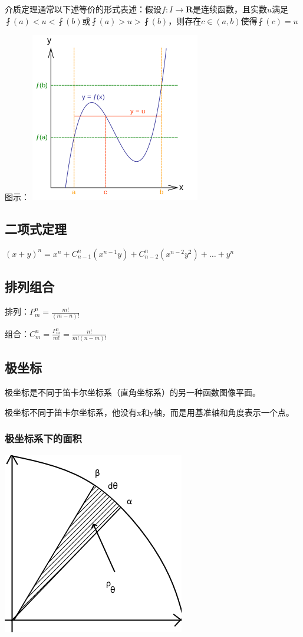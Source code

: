 \documentclass[UTF8]{ctexbook}
\newcommand{\mathCombination}[2]{C_{#1}^{#2}}
\newcommand{\mathPermutation}[2]{P_{#1}^{#2}}
\begin{document}
{{{介质定理通常以下述等价的形式表述：假设$f:I\rightarrow\mathbf{R}$是连续函数，且实数$u$满足$\fint(a)<u<\fint(b)$或$\fint(a)>u>\fint(b)$，则存在$c\in(a,b)$使得$\fint(c) = u$

图示：
\includegraphics{resources/Intermediatevaluetheorem.png}
}%

\subsection{二项式定理}{
  $(x + y)^n = x^n + \mathCombination{n - 1}{n}(x^{n-1} y) + \mathCombination{n - 2}{n}(x^{n-2} y^2) + \dots + y^n$
}%

\subsection{排列组合}{
  排列：$\mathPermutation{m}{n} = \frac{m!}{(m-n)!}$

  组合：$\mathCombination{m}{n} = \frac{\mathPermutation{m}{n}}{m!} = \frac{n!}{m!(n-m)!}$
}%

\subsection{极坐标}{
  极坐标是不同于笛卡尔坐标系（直角坐标系）的另一种函数图像平面。

  极坐标不同于笛卡尔坐标系，他没有x和y轴，而是用基准轴和角度表示一个点。

  \subsubsection{极坐标系下的面积}{
    \includegraphics{resources/polar_coordness.png}

}}}}
\end{document}
